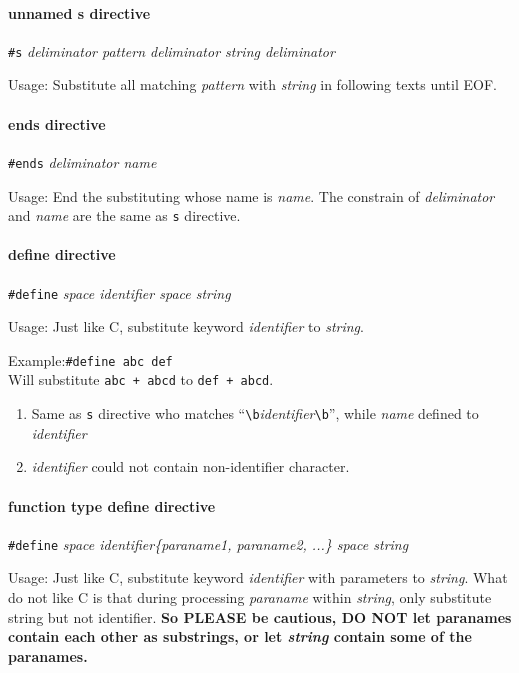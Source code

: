 \documentclass{article}
\begin{document}
\paragraph{unnamed s directive} \verb|#s| \textit{deliminator pattern deliminator string deliminator}

Usage: Substitute all matching \textit{pattern} with \textit{string} in following texts until EOF.

\paragraph{ends directive} \verb|#ends| \textit{deliminator name}

Usage: End the substituting whose name is \textit{name}. The constrain of \textit{deliminator} and \textit{name} are the same as \verb|s| directive.

\paragraph{define directive} \verb|#define| \textit{space identifier space string}

Usage: Just like C, substitute keyword \textit{identifier} to \textit{string}.

Example:\verb|#define abc def| \\ Will substitute \verb|abc + abcd| to \verb|def + abcd|.

\begin{enumerate}
	\item Same as \verb|s| directive who matches ``\verb|\b|\textit{identifier}\verb|\b|'', while \textit{name} defined to \textit{identifier}
	\item \textit{identifier} could not contain non-identifier character.
\end{enumerate}

\paragraph{function type define directive} \verb|#define| \textit{space identifier\{paraname1, paraname2, ...\} space string}

Usage: Just like C, substitute keyword \textit{identifier} with parameters to \textit{string}. What do not like C is that during processing \textit{paraname} within \textit{string}, only substitute string but not identifier. \textbf{So PLEASE be cautious, DO NOT let paranames contain each other as substrings, or let \textit{string} contain some of the paranames.}
\end{document}
